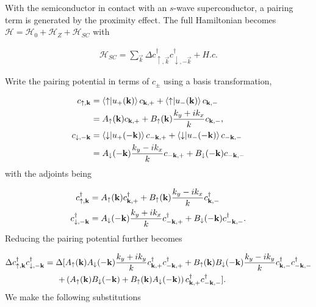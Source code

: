 With the semiconductor in contact with an $s$-wave superconductor, a pairing term is generated by the proximity effect.
The full Hamiltonian becomes $\mathcal{H} = \mathcal{H}_0 + \mathcal{H}_Z + \mathcal{H}_{SC}$ with

\begin{align}
  \mathcal{H}_{SC} = \sum_{\vec{k}} \Delta c_{\uparrow,\vec{k}}^\dagger c_{\downarrow,-\vec{k}}^\dagger + H.c.
\end{align}

Write the pairing potential in terms of $c_{\pm}$ using a basis transformation,

\begin{align}
  c_{\uparrow,\mathbf{k}} &= \bra{\uparrow}\ket{u_+(\mathbf{k})} c_{\mathbf{k},+} + \bra{\uparrow}\ket{u_-(\mathbf{k})} c_{\mathbf{k},-} \\
  &= A_{\uparrow}(\mathbf{k}) c_{\mathbf{k},+} + B_{\uparrow}(\mathbf{k})\dfrac{k_y+i k_x}{k} c_{\mathbf{k},-}, \\
  c_{\downarrow,-\mathbf{k}} &= \bra{\downarrow}\ket{u_+(-\mathbf{k})} c_{-\mathbf{k},+} + \bra{\downarrow}\ket{u_-(-\mathbf{k})} c_{-\mathbf{k},-} \\
  &= A_{\downarrow}(-\mathbf{k})\dfrac{k_y-i k_x}{k} c_{-\mathbf{k},+} + B_{\downarrow}(-\mathbf{k}) c_{-\mathbf{k},-}
\end{align}
with the adjoints being

\begin{align}
  c^{\dagger}_{\uparrow,\mathbf{k}} &= A_{\uparrow}(\mathbf{k}) c^{\dagger}_{\mathbf{k},+} + B_{\uparrow}(\mathbf{k})\dfrac{k_y-i k_x}{k} c^{\dagger}_{\mathbf{k},-} \\
  c^{\dagger}_{\downarrow,-\mathbf{k}} &= A_{\downarrow}(-\mathbf{k})\dfrac{k_y+i k_x}{k} c^{\dagger}_{-\mathbf{k},+} + B_{\downarrow}(-\mathbf{k}) c^{\dagger}_{-\mathbf{k},-}.
\end{align}
Reducing the pairing potential further becomes

\begin{equation}
  \begin{split}
    \Delta c^{\dagger}_{\uparrow,\mathbf{k}} c^{\dagger}_{\downarrow,-\mathbf{k}} = \Delta [ & A_{\uparrow}(\mathbf{k})A_{\downarrow}(-\mathbf{k})\dfrac{k_y+i k_y}{k} c^{\dagger}_{\mathbf{k},+} c^{\dagger}_{-\mathbf{k},+} + B_{\uparrow}(\mathbf{k})B_{\downarrow}(-\mathbf{k})\dfrac{k_y-i k_y}{k} c^{\dagger}_{\mathbf{k},-} c^{\dagger}_{-\mathbf{k},-} \\
    + & \left(A_{\uparrow}(\mathbf{k})B_{\downarrow}(-\mathbf{k})+B_{\uparrow}(\mathbf{k})A_{\downarrow}(-\mathbf{k}) \right) c^{\dagger}_{\mathbf{k},+} c^{\dagger}_{-\mathbf{k},-} ].
  \end{split}
\end{equation}
We make the following substitutions

